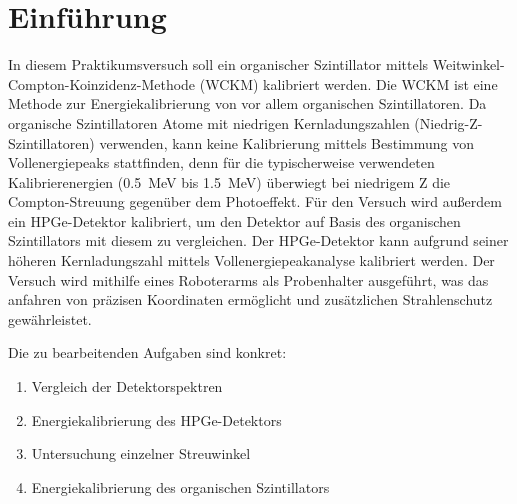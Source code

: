 \section{Einführung}
In diesem Praktikumsversuch soll ein organischer Szintillator mittels Weitwinkel-Compton-Koinzidenz-Methode (WCKM) kalibriert werden.
Die WCKM ist eine Methode zur Energiekalibrierung von vor allem organischen Szintillatoren. Da organische Szintillatoren Atome mit niedrigen Kernladungszahlen (Niedrig-Z-Szintillatoren) verwenden, kann keine Kalibrierung mittels Bestimmung von Vollenergiepeaks stattfinden, denn für die typischerweise verwendeten Kalibrierenergien (\SI{0.5}{\mega\electronvolt} bis \SI{1.5}{\mega\electronvolt}) überwiegt bei niedrigem Z die Compton-Streuung gegenüber dem Photoeffekt.
Für den Versuch wird außerdem ein HPGe-Detektor kalibriert, um den Detektor auf Basis des organischen Szintillators mit diesem zu vergleichen. Der HPGe-Detektor kann aufgrund seiner höheren Kernladungszahl mittels Vollenergiepeakanalyse kalibriert werden.
Der Versuch wird mithilfe eines Roboterarms als Probenhalter ausgeführt, was das anfahren von präzisen Koordinaten ermöglicht und zusätzlichen Strahlenschutz gewährleistet.

Die zu bearbeitenden Aufgaben sind konkret:
\begin{enumerate}
    \item Vergleich der Detektorspektren
    \item Energiekalibrierung des HPGe-Detektors
    \item Untersuchung einzelner Streuwinkel
    \item Energiekalibrierung des organischen Szintillators
\end{enumerate}
